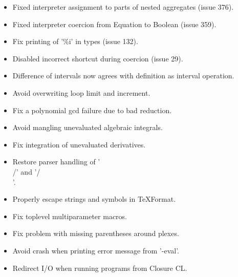 \begin{itemize}

\item Fixed interpreter assignment to parts of nested aggregates
      (issue 376).

\item Fixed interpreter coercion from Equation to Boolean (issue 359).

\item Fix printing of '\%i' in types (issue 132).

\item Disabled incorrect shortcut during coercion (issue 29).

\item Difference of intervals now agrees with definition as interval
      operation.

\item Avoid overwriting loop limit and increment.

\item Fix a polynomial gcd failure due to bad reduction.

\item Avoid mangling unevaluated algebraic integrals.

\item Fix integration of unevaluated derivatives.

\item Restore parser handling of '\\/' and '/\\'.

\item Properly escape strings and symbols in TeXFormat.

\item Fix toplevel multiparameter macros.

\item Fix problem with missing parentheses around plexes.

\item Avoid crash when printing error message from '-eval'.

\item Redirect I/O when running programs from Closure CL.

\end{itemize}

